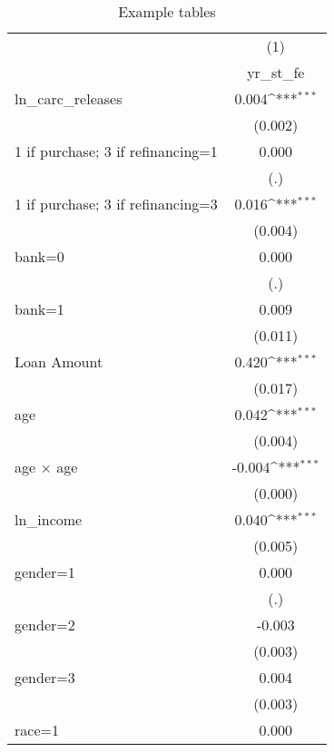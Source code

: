 {
\def\sym#1{\ifmmode^{#1}\else\(^{#1}\)\fi}
\begin{longtable}{l*{1}{c}}
\caption{Example tables \label{tab-exp}}\\
\hline\hline\endfirsthead\hline\endhead\hline\endfoot\endlastfoot
                    &\multicolumn{1}{c}{(1)}         \\
                    &    yr\_st\_fe         \\
\hline
ln\_carc\_releases    &       0.004\sym{***}\\
                    &     (0.002)         \\
1 if purchase; 3 if refinancing=1&       0.000         \\
                    &         (.)         \\
1 if purchase; 3 if refinancing=3&       0.016\sym{***}\\
                    &     (0.004)         \\
bank=0              &       0.000         \\
                    &         (.)         \\
bank=1              &       0.009         \\
                    &     (0.011)         \\
Loan Amount         &       0.420\sym{***}\\
                    &     (0.017)         \\
age                 &       0.042\sym{***}\\
                    &     (0.004)         \\
age $\times$ age    &      -0.004\sym{***}\\
                    &     (0.000)         \\
ln\_income           &       0.040\sym{***}\\
                    &     (0.005)         \\
gender=1            &       0.000         \\
                    &         (.)         \\
gender=2            &      -0.003         \\
                    &     (0.003)         \\
gender=3            &       0.004         \\
                    &     (0.003)         \\
race=1              &       0.000         \\

\end{longtable}}
